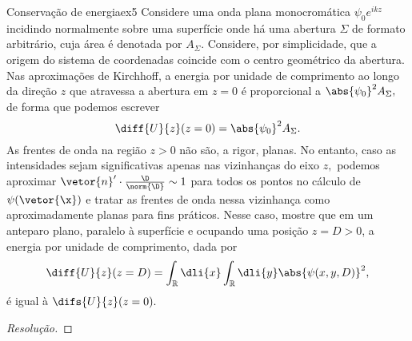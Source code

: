\begin{exercício}{Conservação de energia}{ex5}
    Considere uma onda plana monocromática \(\psi_0 e^{ikz}\) incidindo normalmente sobre uma superfície onde há uma abertura \(\Sigma\) de formato arbitrário, cuja área é denotada por \(A_{\Sigma}.\) Considere, por simplicidade, que a origem do sistema de coordenadas coincide com o centro geométrico da abertura. Nas aproximações de Kirchhoff, a energia por unidade de comprimento ao longo da direção \(z\) que atravessa a abertura em \(z = 0\) é proporcional a \(\abs{\psi_0}^2 A_\Sigma,\) de forma que podemos escrever
    \begin{equation*}
        \diff{U}{z}(z = 0) = \abs{\psi_0}^2 A_{\Sigma}.
    \end{equation*}
    As frentes de onda na região \(z > 0\) não são, a rigor, planas. No entanto, caso as intensidades sejam significativas apenas nas vizinhanças do eixo \(z,\) podemos aproximar \(\vetor{n}'\cdot \frac{\D}{\norm{\D}} \sim 1\) para todos os pontos no cálculo de \(\psi(\vetor{\x})\) e tratar as frentes de onda nessa vizinhança como aproximadamente planas para fins práticos. Nesse caso, mostre que em um anteparo plano, paralelo à superfície e ocupando uma posição \(z = D > 0\), a energia por unidade de comprimento, dada por
    \begin{equation*}
        \diff{U}{z}(z = D) = \int_{\mathbb{R}}\dli{x}\int_{\mathbb{R}} \dli{y} \abs{\psi(x, y, D)}^2,
    \end{equation*}
    é igual à \(\difs{U}{z}(z = 0).\)
\end{exercício}
\begin{proof}[Resolução]
    
\end{proof}
